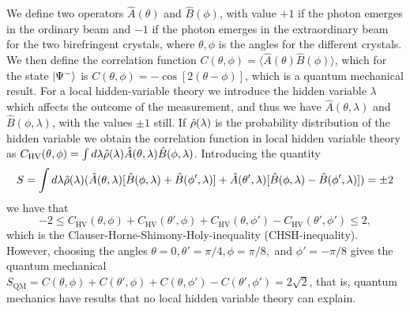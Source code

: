 We define two operators $\hat{A}(\theta)$ and $\hat{B}(\phi)$, with value $+1$ if the photon emerges in the ordinary beam and $-1$ if the photon emerges in the extraordinary beam for the two birefringent crystals, where $\theta,\phi$ is the angles for the different crystals. We then define the correlation function $C(\theta,\phi) = \langle \hat{A}(\theta)\hat{B}(\phi) \rangle$, which for the state $\ket{\Psi^-}$ is $C(\theta,\phi) = -\cos[2(\theta-\phi)]$, which is a quantum mechanical result. For a local hidden-variable theory we introduce the hidden variable $\lambda$ which affects the outcome of the measurement, and thus we have $\hat{A}(\theta,\lambda)$ and $\hat{B}(\phi,\lambda)$, with the values $\pm 1$ still. If $\hat{\rho}(\lambda)$ is the probability distribution of the hidden variable we obtain the correlation function in local hidden variable theory as $C_\text{HV}(\theta,\phi) = \int d\lambda \density(\lambda) \hat{A}(\theta,\lambda)\hat{B}(\phi,\lambda)$. Introducing the quantity 
\begin{equation}
    S = \int d\lambda\density(\lambda) (\hat{A}(\theta,\lambda) [\hat{B}(\phi,\lambda) + \hat{B}(\phi',\lambda)] +\hat{A}(\theta',\lambda) [\hat{B}(\phi,\lambda) - \hat{B}(\phi',\lambda)]) = \pm 2
\end{equation}
we have that
\begin{equation}
    -2\leq C_\text{HV}(\theta,\phi) + C_\text{HV}(\theta',\phi) + C_\text{HV}(\theta,\phi') - C_\text{HV}(\theta',\phi') \leq 2,
\end{equation}
which is the Clauser-Horne-Shimony-Holy-inequality (CHSH-inequality). However, choosing the angles $\theta=0, \theta'=\pi/4,\phi=\pi/8,$ and $\phi'=-\pi/8$ gives the quantum mechanical $S_\text{QM} = C(\theta,\phi) + C(\theta',\phi) + C(\theta,\phi') - C(\theta',\phi') = 2\sqrt{2}$, that is, quantum mechanics have results that no local hidden variable theory can explain.

